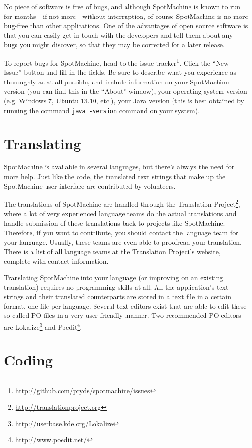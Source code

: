 \documentclass[a4paper,12pt]{report}
\begin{document}
No piece of software is free of bugs, and although SpotMachine is known to run for months---if
not more---without interruption, of course SpotMachine is no more bug-free than other
applications. One of the advantages of open source software is that you can easily get in touch
with the developers and tell them about any bugs you might discover, so that they may be corrected
for a later release.

To report bugs for SpotMachine, head to the issue
tracker\footnote{\url{http://github.com/pryds/spotmachine/issues}}. Click the ``New Issue'' button
and fill in the fields. Be sure to describe what you experience as thoroughly as at all possible,
and include information on your SpotMachine version (you can find this in the ``About'' window),
your operating system version (e.g. Windows 7, Ubuntu 13.10, etc.), your Java version (this is
best obtained by running the command \texttt{java -version} command on your system).

\section{Translating}

SpotMachine is available in several languages, but there's always the need for more help. Just like
the code, the translated text strings that make up the SpotMachine user interface are contributed
by volunteers.

The translations of SpotMachine are handled through the Translation
Project\footnote{\url{http://translationproject.org}}, where a lot of very experienced
language teams do the actual translations and handle submission of these translations back to projects
like SpotMachine. Therefore, if you want to contribute, you should contact the language team for
your language. Usually, these teams are even able to proofread your translation. There is a list of
all language teams at the Translation Project's website, complete with contact information.

Translating SpotMachine into your language (or improving on an existing translation) requires no
programming skills at all. All the application's text strings and their translated counterparts are
stored in a text file in a certain format, one file per language. Several text editors exist that are
able to edit these so-called PO files in a very user friendly manner. Two recommended PO editors are
Lokalize\footnote{\url{http://userbase.kde.org/Lokalize}} and
Poedit\footnote{\url{http://www.poedit.net/}}.

\section{Coding}
\end{document}
